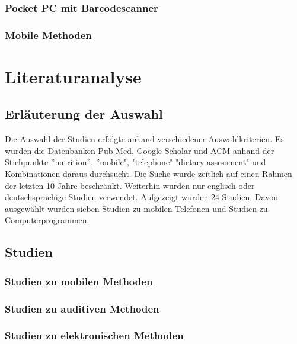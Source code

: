 \subsubsection{Pocket PC mit Barcodescanner}

\subsubsection{Mobile Methoden}

\section{Literaturanalyse}

\subsection{Erläuterung der Auswahl}

Die Auswahl der Studien erfolgte anhand verschiedener Auswahlkriterien. Es wurden die Datenbanken Pub Med, Google Scholar und ACM anhand der Stichpunkte ''nutrition'', ''mobile", "telephone" "dietary assessment" und Kombinationen daraus durchsucht. Die Suche wurde zeitlich auf einen Rahmen der letzten 10 Jahre beschränkt. Weiterhin wurden nur englisch oder deutschsprachige Studien verwendet. Aufgezeigt wurden 24 Studien. Davon ausgewählt wurden sieben Studien zu mobilen Telefonen und Studien zu Computerprogrammen. 

\subsection{Studien}
\subsubsection{Studien zu mobilen Methoden}
\subsubsection{Studien zu auditiven Methoden}
\subsubsection{Studien zu elektronischen Methoden}





